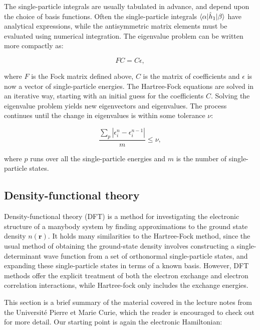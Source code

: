 The single-particle integrals are usually tabulated
in advance, and depend upon the choice of basis functions.
Often the single-particle integrals $\braket{\alpha | \hat{h}_1 | \beta}$
have analytical expressions, while the antisymmetric matrix elements
must be evaluated using numerical integration.
The eigenvalue problem can be written more compactly as:

\begin{equation}
FC = C\epsilon ,
\end{equation}

where $F$ is the Fock matrix defined above, $C$ is the matrix
of coefficients and $\epsilon$ is now
a vector of single-particle energies.
The Hartree-Fock equations are solved in an iterative way,
starting with an initial guess for the coefficients $C$.
Solving the eigenvalue problem yields new eigenvectors
and eigenvalues.
The process continues until the change in eigenvalues
is within some tolerance $\nu$:

\begin{equation}
\frac{\sum_p \left| \epsilon_i^n - \epsilon_i^{n-1} \right|}
{m} \leq \nu ,
\end{equation}

where $p$ runs over all the single-particle energies and
$m$ is the number of single-particle states.

\subsection{Density-functional theory}
Density-functional theory (DFT) is a method for
investigating the electronic structure of a manybody system
by finding approximations to the ground state
density $n(\bm{r})$.
It holds many similarities to the Hartree-Fock method,
since the usual method of obtaining the ground-state density
involves constructing a single-determinant wave function
from a set of orthonormal single-particle states,
and expanding these single-particle states in terms
of a known basis. 
However, DFT methods offer the explicit treatment of both the
electron exchange and electron correlation interactions,
while Hartree-fock only includes
the exchange energies.
\par
This section is a brief summary of the material covered
in the \parencite[Toulouse][pages 1-12]{toulouse2017}
lecture notes from the Université Pierre et Marie Curie,
which the reader is encouraged to check out for more detail.
Our starting point is again the electronic Hamiltonian:

